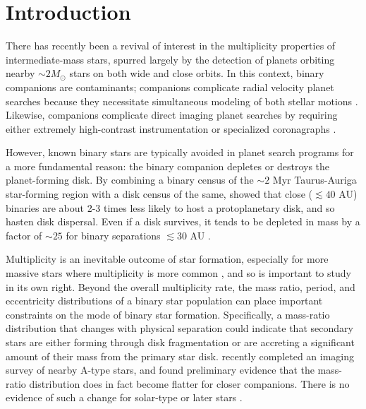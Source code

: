 \documentclass{emulateapj}
\begin{document}
\maketitle

\section{Introduction}


\label{sec:intro}
There has recently been a revival of interest in the multiplicity properties of intermediate-mass stars,  spurred largely by the detection of planets orbiting nearby $\sim 2 M_{\odot}$ stars on both wide \citep[e.g.][]{Lagrange2010, Marois2008} and close \citep{Johnson2011} orbits. In this context, binary companions are contaminants; companions complicate radial velocity planet searches because they necessitate simultaneous modeling of both stellar motions \citep[e.g.][]{Bergmann2015}. Likewise, companions complicate direct imaging planet searches by requiring either extremely high-contrast instrumentation \citep{Thalmann2014} or specialized coronagraphs \citep{Crepp2010}. 

However, known binary stars are typically avoided in planet search programs for a more fundamental reason: the binary companion depletes or destroys the planet-forming disk. By combining a binary census of the $\sim 2$ Myr Taurus-Auriga star-forming region with a disk census of the same, \cite{Kraus2012} showed that close ($\lesssim 40$ AU) binaries are about 2-3 times less likely to host a protoplanetary disk, and so hasten disk dispersal. Even if a disk survives, it tends to be depleted in mass by a factor of $\sim 25$ for binary separations $\lesssim 30$ AU \citep{Harris2012}.

Multiplicity is an inevitable outcome of star formation, especially for more massive stars where multiplicity is more common \citep{Zinnecker2007}, and so is important to study in its own right. Beyond the overall multiplicity rate, the mass ratio, period, and eccentricity distributions of a binary star population can place important constraints on the mode of binary star formation. Specifically, a mass-ratio distribution that changes with physical separation could indicate that secondary stars are either forming through disk fragmentation \citep[e.g.][]{Kratter2006, Stamatellos2011}  or are accreting a significant amount of their mass from the primary star disk. \cite{DeRosa2014} recently completed an imaging survey of nearby A-type stars, and found preliminary evidence that the mass-ratio distribution does in fact become flatter for closer companions. There is no evidence of such a change for solar-type or later stars \citep{Meyer2013}.
\end{document}
